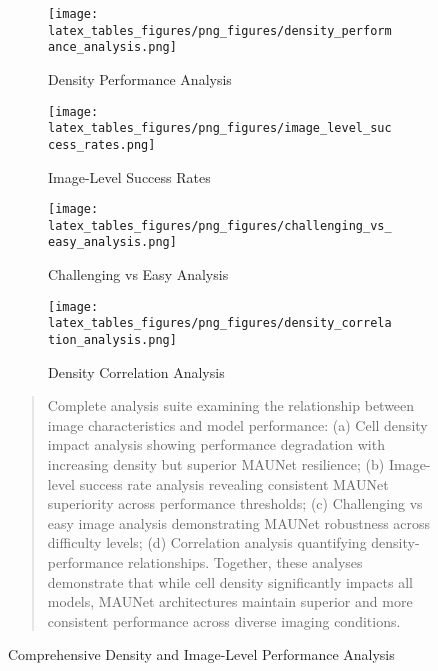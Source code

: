 \begin{figure}[htbp]
\centering
\begin{subfigure}[b]{0.48\textwidth}
    \texttt{[image: latex\_tables\_figures/png\_figures/density\_performance\_analysis.png]}
    \caption{Density Performance Analysis}
    \label{fig:density_sub}
\end{subfigure}
\hfill
\begin{subfigure}[b]{0.48\textwidth}
    \texttt{[image: latex\_tables\_figures/png\_figures/image\_level\_success\_rates.png]}
    \caption{Image-Level Success Rates}
    \label{fig:success_sub}
\end{subfigure}

\vspace{0.5cm}

\begin{subfigure}[b]{0.48\textwidth}
    \texttt{[image: latex\_tables\_figures/png\_figures/challenging\_vs\_easy\_analysis.png]}
    \caption{Challenging vs Easy Analysis}
    \label{fig:difficulty_sub}
\end{subfigure}
\hfill
\begin{subfigure}[b]{0.48\textwidth}
    \texttt{[image: latex\_tables\_figures/png\_figures/density\_correlation\_analysis.png]}
    \caption{Density Correlation Analysis}
    \label{fig:correlation_sub}
\end{subfigure}

\caption{Comprehensive Density and Image-Level Performance Analysis}
\label{fig:comprehensive_density_analysis}
\begin{quote}
\small
Complete analysis suite examining the relationship between image characteristics and model performance: (a) Cell density impact analysis showing performance degradation with increasing density but superior MAUNet resilience; (b) Image-level success rate analysis revealing consistent MAUNet superiority across performance thresholds; (c) Challenging vs easy image analysis demonstrating MAUNet robustness across difficulty levels; (d) Correlation analysis quantifying density-performance relationships. Together, these analyses demonstrate that while cell density significantly impacts all models, MAUNet architectures maintain superior and more consistent performance across diverse imaging conditions.
\end{quote}
\end{figure}
